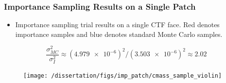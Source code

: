 \documentclass[t, pdftex]{beamer}
\begin{document}
\begin{frame}
\frametitle{\small Importance Sampling Results on a Single Patch}
\vspace{-18pt}
\begin{itemize}
    \item Importance sampling trial results on a single CTF face. {\color{utred}Red} denotes importance samples and {\color{utblue}blue} denotes standard Monte Carlo samples.  
\end{itemize}
\[ \frac{\sigma^2_{MC}}{\sigma^2_{I}} \approx (\num{4.979e-6})^2 / (\num{3.503e-6})^2  \approx 2.02 \]
\vspace{-18pt}

\begin{figure}[]
    \centering
    \texttt{[image: /dissertation/figs/imp\_patch/cmass\_sample\_violin]}\\
    \label{model_overview}
\end{figure}
\end{frame}
\end{document}
